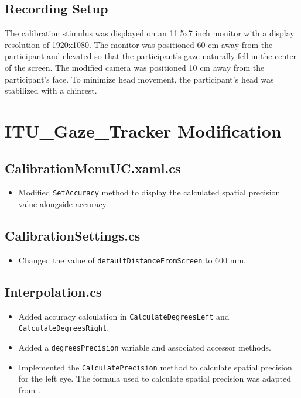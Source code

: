 \documentclass[11pt]{article}
\begin{document}
\subsection{Recording Setup}
The calibration stimulus was displayed on an 11.5x7 inch monitor with a display resolution of 1920x1080. The monitor was positioned 60 cm away from the participant and elevated so that the participant's gaze naturally fell in the center of the screen. The modified camera was positioned 10 cm away from the participant's face. To minimize head movement, the participant's head was stabilized with a chinrest. 

\section{ITU\_Gaze\_Tracker Modification} %
\subsection*{CalibrationMenuUC.xaml.cs}
    \begin{itemize}
        \item Modified \texttt{SetAccuracy} method to display the calculated spatial precision value alongside accuracy.
    \end{itemize}
\subsection*{CalibrationSettings.cs}
    \begin{itemize}
        \item Changed the value of \texttt{defaultDistanceFromScreen} to 600 mm.
    \end{itemize}
\subsection*{Interpolation.cs}
 \begin{itemize}
    \item Added accuracy calculation in \texttt{CalculateDegreesLeft} and \texttt{CalculateDegreesRight}.
    \item Added a \texttt{degreesPrecision} variable and associated accessor methods. 
    \item Implemented the \texttt{CalculatePrecision} method to calculate spatial precision for the left eye. The formula used to calculate spatial precision was adapted from \cite{Holmqvist}.
 \end{itemize}
\end{document}
